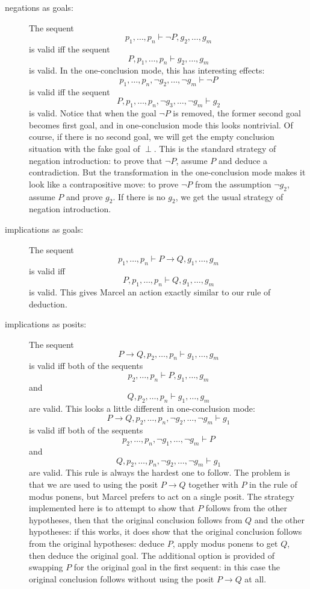 \documentclass[12pt]{book}
\begin{document}
\begin{description}
\item[negations as goals:]  The sequent $$p_1,\ldots,p_n \vdash \neg P,g_2,\ldots,g_m$$ is valid iff the sequent $$P,p_1,\ldots,p_n \vdash g_2,\ldots,g_m$$  is valid.  In the one-conclusion mode, this has interesting effects:  $$p_1,\ldots,p_n,\neg g_2,\ldots,\neg g_m \vdash \neg P$$ is valid iff the sequent $$P,p_1,\ldots,p_n,\neg g_3 ,\ldots,\neg g_m\vdash g_2$$  is valid.  Notice that when the goal $\neg P$ is removed, the former second goal becomes first goal, and in one-conclusion mode this looks nontrivial.  Of course, if there is no second goal, we will get the empty conclusion situation with the fake goal of $\perp$.  This is the standard strategy of negation introduction:  to prove that $\neg P$, assume $P$ and deduce a contradiction.  But the transformation in the one-conclusion mode makes it look like a contrapositive move:  to prove $\neg P$ from the assumption $\neg g_2$, assume $P$ and prove $g_2$.  If there is no $g_2$, we get the usual strategy of negation introduction.

\item[implications as goals:]  The sequent $$p_1,\ldots,p_n \vdash P \rightarrow Q,g_1,\ldots,g_m$$ is valid iff $$P, p_1,\ldots,p_n \vdash Q,g_1,\ldots,g_m$$ is valid.  This gives Marcel an action exactly similar to our rule of deduction.

\item[implications as posits:]  The sequent $$P \rightarrow Q,p_2,\ldots,p_n \vdash g_1,\ldots, g_m$$ is valid iff both of the sequents  $$p_2,\ldots,p_n \vdash P, g_1,\ldots, g_m$$ and $$Q,p_2,\ldots,p_n \vdash g_1,\ldots, g_m$$ are valid.  This looks a little different in one-conclusion mode:  
$$P \rightarrow Q,p_2,\ldots,p_n ,\neg g_2,\ldots, \neg g_m\vdash g_1$$ is valid iff both of the sequents  $$p_2,\ldots,p_n, \neg g_1,\ldots, \neg g_m \vdash P$$ and $$Q,p_2,\ldots,p_n,\neg g_2,\ldots, \neg g_m \vdash g_1$$ are valid.  This rule is always the hardest one to follow.  The problem is that we are used to using the posit $P \rightarrow Q$ together with $P$ in the rule of modus ponens, but Marcel prefers to act on a single posit.  The strategy implemented here is to attempt to show that $P$ follows from the other hypotheses, then that the original conclusion follows from $Q$ and the other hypotheses:  if this works, it does show that the original conclusion follows from the original hypotheses:  deduce $P$, apply modus ponens to get $Q$, then deduce the original goal.
The additional option is provided of swapping $P$ for the original goal in the first sequent:  in this case the original conclusion follows without using the posit $P \rightarrow Q$ at all.


\end{description}
\end{document}
